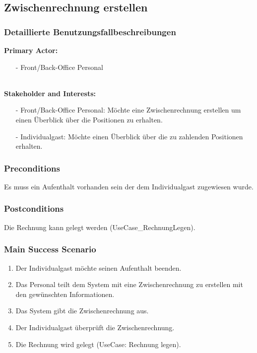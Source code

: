 \documentclass[./detailed_overview_usecases.tex]{subfiles}
\begin{document}
    \subsection{Zwischenrechnung erstellen}
    \subsubsection{Detaillierte Benutzungsfallbeschreibungen}
    \textbf{Primary Actor: }
    \begin{itemize}
        \item [-] Front/Back-Office Personal
    \end{itemize}
    \\
    \textbf{Stakeholder and Interests:}
    \begin{itemize}
        \item[-] Front/Back-Office Personal: Möchte eine Zwischenrechnung erstellen um einen Überblick über die Positionen zu erhalten.
        \item[-] Individualgast: Möchte einen Überblick über die zu zahlenden Positionen erhalten.
    \end{itemize}

    \subsubsection*{Preconditions}
    Es muss ein Aufenthalt vorhanden sein der dem Individualgast zugewiesen wurde.

    \subsubsection*{Postconditions}
    Die Rechnung kann gelegt werden (UseCase_RechnungLegen).

    \subsubsection*{Main Success Scenario}
    \begin{enumerate}
        \item Der Individualgast möchte seinen Aufenthalt beenden.
        \item Das Personal teilt dem System mit eine Zwischenrechnung zu erstellen mit den gewünschten Informationen.
        \item Das System gibt die Zwischenrechnung aus.
        \item Der Individualgast überprüft die Zwischenrechnung.
        \item Die Rechnung wird gelegt (UseCase: Rechnung legen).
    \end{enumerate}
\end{document}
